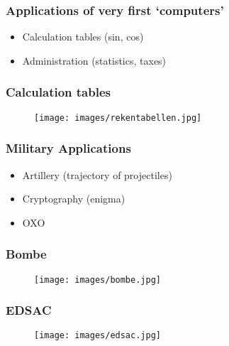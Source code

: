 \documentclass[aspectratio=43]{uva-inf-presentation}
\begin{document}
\begin{frame}
\frametitle{Applications of very first `computers'}

\begin{itemize}
\item Calculation tables (sin, cos)
\item Administration (statistics, taxes)
\end{itemize}

\end{frame}


\begin{frame}
\frametitle{Calculation tables}

\begin{figure}
\texttt{[image: images/rekentabellen.jpg]}
\end{figure}

\end{frame}


\begin{frame}
\frametitle{Military Applications}

\begin{itemize}
\item Artillery (trajectory of projectiles)
\item Cryptography (enigma)
\item OXO
\end{itemize}

\end{frame}


\begin{frame}
\frametitle{Bombe}

\begin{figure}
\texttt{[image: images/bombe.jpg]}
\end{figure}

\end{frame}


\begin{frame}
\frametitle{EDSAC}

\begin{figure}
\texttt{[image: images/edsac.jpg]}
\end{figure}

\end{frame}
\end{document}
